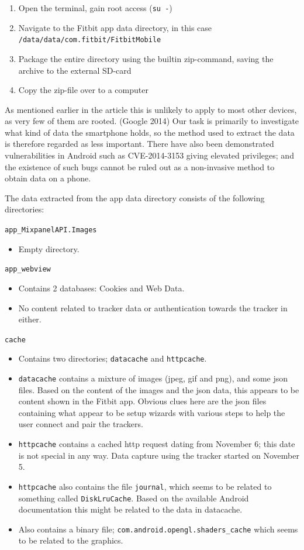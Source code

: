 \documentclass[a4paper,11pt,dvips]{article}
\begin{document}
\begin{enumerate}
\item Open the terminal, gain root access (\texttt{su -})
\item Navigate to the Fitbit app data directory, in this case \\ \texttt{/data/data/com.fitbit/FitbitMobile}
\item Package the entire directory using the builtin zip-command, saving the archive to the external SD-card
\item Copy the zip-file over to a computer
\end{enumerate}

As mentioned earlier in the article this is unlikely to apply to most other devices, as very few of them are rooted. (Google 2014) Our task is primarily to investigate what kind of data the smartphone holds, so the method used to extract the data is therefore regarded as less important. There have also been demonstrated vulnerabilities in Android such as CVE-2014-3153 giving elevated privileges; and the existence of such bugs cannot be ruled out as a non-invasive method to obtain data on a phone.

The data extracted from the app data directory consists of the following directories:

\vspace{1em}
\noindent
\texttt{app\_MixpanelAPI.Images}
\begin{itemize}
\item Empty directory.
\end{itemize}

\noindent
\texttt{app\_webview}
\begin{itemize}
\item Contains 2 databases: Cookies and Web Data.
\item No content related to tracker data or authentication towards the tracker in either.
\end{itemize}

\noindent
\texttt{cache}
\begin{itemize}
\item Contains two directories; \texttt{datacache} and \texttt{httpcache}.
\item \texttt{datacache} contains a mixture of images (jpeg, gif and png), and some json files. Based on the content of the images and the json data, this appears to be content shown in the Fitbit app. Obvious clues here are the json files containing what appear to be setup wizards with various steps to help the user connect and pair the trackers.
\item \texttt{httpcache} contains a cached http request dating from November 6; this date is not special in any way. Data capture using the tracker started on November 5.
\item \texttt{httpcache} also contains the file \texttt{journal}, which seems to be related to something called \texttt{DiskLruCache}. Based on the available Android documentation this might be related to the data in datacache.
\item Also contains a binary file; \texttt{com.android.opengl.shaders\_cache} which seems to be related to the graphics.
\end{itemize}
\end{document}
